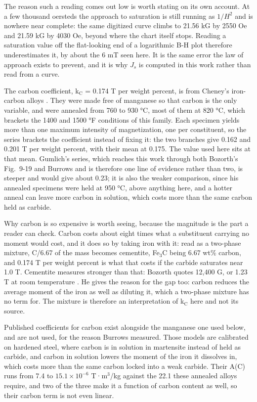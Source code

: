 \documentclass[
  11pt,
]{article}
\begin{document}
The reason such a reading comes out low is worth stating on its own account. At a few thousand oersteds the approach to saturation is still running as \(1/H^{2}\) and is nowhere near complete: the same digitized curve climbs to 21.56 kG by 2550 Oe and 21.59 kG by 4030 Oe, beyond where the chart itself stops. Reading a saturation value off the flat-looking end of a logarithmic B-H plot therefore underestimates it, by about the 6 mT seen here. It is the same error the law of approach exists to prevent, and it is why \(J_s\) is computed in this work rather than read from a curve.

The carbon coefficient, k\(_{\mathrm{C}}\) = 0.174 T per weight percent, is from Cheney's iron-carbon alloys \cite{cheney}. They were made free of manganese so that carbon is the only variable, and were annealed from 760 to 930 °C, most of them at 820 °C, which brackets the 1400 and 1500 °F conditions of this family. Each specimen yields more than one maximum intensity of magnetization, one per constituent, so the series brackets the coefficient instead of fixing it: the two branches give 0.162 and 0.201 T per weight percent, with their mean at 0.175. The value used here sits at that mean. Gumlich's series, which reaches this work through both Bozorth's Fig.~9-19 and Burrows and is therefore one line of evidence rather than two, is steeper and would give about 0.23; it is also the weaker comparison, since his annealed specimens were held at 950 °C, above anything here, and a hotter anneal can leave more carbon in solution, which costs more than the same carbon held as carbide.

Why carbon is so expensive is worth seeing, because the magnitude is the part a reader can check. Carbon costs about eight times what a substituent carrying no moment would cost, and it does so by taking iron with it: read as a two-phase mixture, C/6.67 of the mass becomes cementite, Fe\(_{3}\)C being 6.67 wt\% carbon, and 0.174 T per weight percent is what that costs if the carbide saturates near 1.0 T. Cementite measures stronger than that: Bozorth quotes 12,400 G, or 1.23 T at room temperature \cite{bozorth1951}. He gives the reason for the gap too: carbon reduces the average moment of the iron as well as diluting it, which a two-phase mixture has no term for. The mixture is therefore an interpretation of k\(_{\mathrm{C}}\) here and not its source.

Published coefficients for carbon exist alongside the manganese one used below, and are not used, for the reason Burrows measured. Those models are calibrated on hardened steel, where carbon is in solution in martensite instead of held as carbide, and carbon in solution lowers the moment of the iron it dissolves in, which costs more than the same carbon locked into a weak carbide. Their A(C) runs from 7.4 to \(15.1\times10^{-6}\) T·m\(^{3}\)/kg against the 22.1 these annealed alloys require, and two of the three make it a function of carbon content as well, so their carbon term is not even linear.
\end{document}
